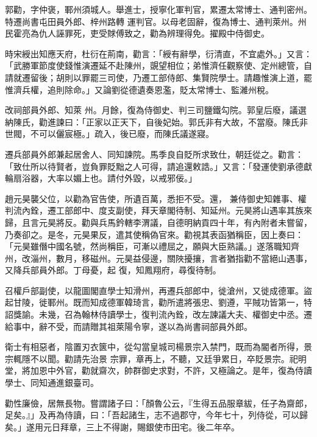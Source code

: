 \begin{pinyinscope}
 郭勸，字仲褒，鄆州須城人。舉進士，授寧化軍判官，累遷太常博士、通判密州。特遷尚書屯田員外郎、梓州路轉
 運判官。以母老固辭，復為博士、通判萊州。州民霍亮為仇人誣罪死，吏受賕傅致之，勸為辨理得免。擢殿中侍御史。



 時宋綬出知應天府，杜衍在荊南，勸言：「綬有辭學，衍清直，不宜處外。」又言：「武勝軍節度使錢惟演遷延不赴陳州，覬望相位；弟惟濟任觀察使、定州總管，自請就遷留後；胡則以罪罷三司使，乃遷工部侍郎、集賢院學士。請趣惟演上道，罷惟濟兵權，追則除命。」又論劉從德遺奏恩濫，貶太常博士、監濰州稅。



 改祠部員外郎、知萊
 州。月餘，復為侍御史、判三司鹽鐵勾院。郭皇后廢，議選納陳氏，勸進諫曰：「正家以正天下，自後妃始。郭氏非有大故，不當廢。陳氏非世閥，不可以儷宸極。」疏入，後已廢，而陳氏議遂寢。



 遷兵部員外郎兼起居舍人、同知諫院。馬季良自貶所求致仕，朝廷從之。勸言：「致仕所以待賢者，豈負罪貶黜之人可得，請追還敕誥。」又言：「發運使劉承德獻輪扇浴器，大率以媚上也。請付外毀，以戒邪佞。」



 趙元昊襲父位，以勸為官告使，所遺百萬，悉拒不受。還，
 兼侍御史知雜事、權判流內銓，遷工部郎中、度支副使，拜天章閣待制、知延州。元昊將山遇率其族來歸，且言元昊將反。勸與兵馬鈐轄李渭議，自德明納貢四十年，有內附者未嘗留，乃奏卻之。是冬，元昊果反，遣其使稱偽官來。勸視其表函猶稱臣，因上奏曰：「元昊雖僭中國名號，然尚稱臣，可漸以禮屈之，願與大臣熟議。」遂落職知齊州，改淄州，數月，移磁州。元昊益侵邊，關陜擾攘，言者猶指勸不當絕山遇事，又降兵部員外郎。丁母憂，起
 復，知鳳翔府，尋復待制。



 召權戶部副使，以龍圖閣直學士知滑州，再遷兵部郎中，徙滄州，又徙成德軍。盜起甘陵，徙鄆州。既而知成德軍韓琦言，勸所遣將張忠、劉遵，平賊功皆第一，特詔獎諭。未幾，召為翰林侍讀學士，復判流內銓，改左諫議大夫、權御史中丞。遷給事中，辭不受，而請贈其祖萊陽令寧，遂以為尚書祠部員外郎。



 衛士有相惡者，陰置刃衣篋中，從勾當皇城司楊景宗入禁門，既而為閽者所得，景宗輒隱不以聞。勸請先治景
 宗罪，章再上，不聽，又廷爭累日，卒貶景宗。祀明堂，將加恩中外官，勸就齋次，帥群御史求對，不許，又極論之。是年，復為侍讀學士、同知通進銀臺司。



 勸性廉儉，居無長物。嘗謂諸子曰：「顏魯公云，『生得五品服章紱，任子為齋郎，足矣。』」及再為侍讀，曰：「吾起諸生，志不過郡守，今年七十，列侍從，可以歸矣。」遂用元日拜章，三上不得謝，賜銀使市田宅。後二年卒。




\end{pinyinscope}
